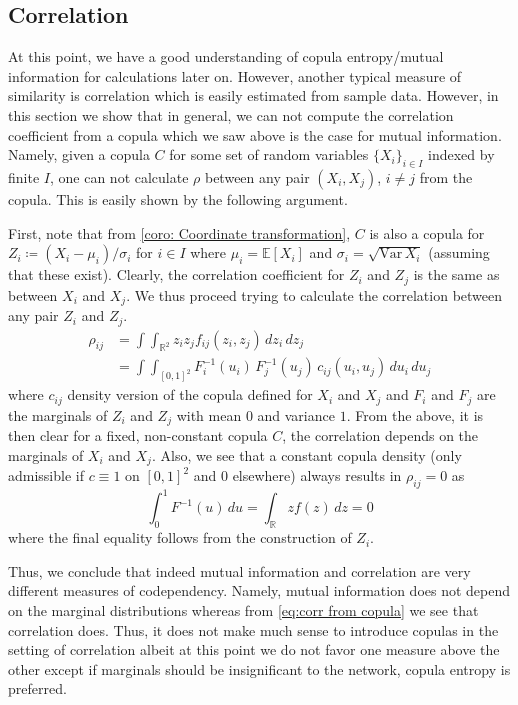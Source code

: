 \documentclass[../Thesis.tex]{subfiles}
\begin{document}
\subsection{Correlation}
At this point, we have a good understanding of copula entropy/mutual information for calculations later on. However, another typical measure of similarity is correlation which is easily estimated from sample data. However, in this section we show that in general, we can not compute the correlation coefficient from a copula which we saw above is the case for mutual information. Namely, given a copula $C$ for some set of random variables $\{X_i\}_{i\in I}$ indexed by finite $I$, one can not calculate $\rho$ between any pair $(X_i ,X_j)$, $i\neq j$ from the copula. This is easily shown by the following argument.

First, note that from \autoref{coro: Coordinate transformation}, $C$ is also a copula for $Z_i \coloneq \left( X_i - \mu_i\right) / \sigma_i$ for $i \in I$ where $\mu_i = \mathbb{E}[X_i]$ and $\sigma_i = \sqrt{\text{Var} \, X_i}$ (assuming that these exist). Clearly, the correlation coefficient for $Z_i$ and $Z_j$ is the same as between $X_i$ and $X_j$. We thus proceed trying to calculate the correlation between any pair $Z_i$ and $Z_j$.
\begin{equation}\label{eq:corr from copula}
    \begin{split}
        \rho_{ij} & = \int\int_{\mathbb{R}^2} z_i z_j f_{ij}(z_i,z_j) \, dz_i \, dz_j                       \\
                  & = \int\int_{[0,1]^2} F_i^{-1}(u_i) \, F_j^{-1}(u_j) \, c_{ij}(u_i, u_j) \, du_i \, du_j
    \end{split}
\end{equation}
where $c_{ij}$ density version of the copula defined for $X_i$ and $X_j$ and $F_i$ and $F_j$ are the marginals of $Z_i$ and $Z_j$ with mean $0$ and variance $1$. From the above, it is then clear for a fixed, non-constant copula $C$, the correlation depends on the marginals of $X_i$ and $X_j$. Also, we see that a constant copula density (only admissible if $c \equiv 1$ on $[0,1]^2$ and $0$ elsewhere) always results in $\rho_{ij} = 0$ as
$$\int_0^1 F^{-1}(u) \, du = \int_{\mathbb{R}} z f(z) \, dz = 0$$
where the final equality follows from the construction of $Z_i$.

Thus, we conclude that indeed mutual information and correlation are very different measures of codependency. Namely, mutual information does not depend on the marginal distributions whereas from \autoref{eq:corr from copula} we see that correlation does. Thus, it does not make much sense to introduce copulas in the setting of correlation albeit at this point we do not favor one measure above the other except if marginals should be insignificant to the network, copula entropy is preferred.
\end{document}
